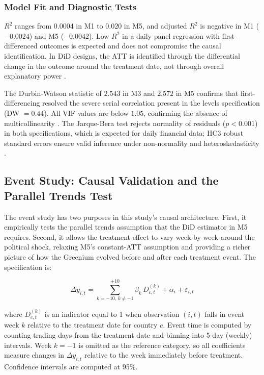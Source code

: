 \documentclass[12pt,a4paper]{article}
\begin{document}
\subsubsection{Model Fit and Diagnostic Tests}

$R^2$ ranges from $0.0004$ in M1 to $0.020$ in M5, and adjusted $R^2$ is negative in M1 ($-0.0024$) and M5 ($-0.0042$). Low $R^2$ in a daily panel regression with first-differenced outcomes is expected and does not compromise the causal identification. In DiD designs, the ATT is identified through the differential change in the outcome around the treatment date, not through overall explanatory power \citep{Callaway2021}.

The Durbin-Watson statistic of $2.543$ in M3 and $2.572$ in M5 confirms that first-differencing resolved the severe serial correlation present in the levels specification (DW $= 0.44$). All VIF values are below $1.05$, confirming the absence of multicollinearity \citep{Chatterjee2012}. The Jarque-Bera test rejects normality of residuals ($p < 0.001$) in both specifications, which is expected for daily financial data; HC3 robust standard errors ensure valid inference under non-normality and heteroskedasticity \citep{MacKinnon1985}.

\subsection{Event Study: Causal Validation and the Parallel Trends Test}

The event study has two purposes in this study's causal architecture. First, it empirically tests the parallel trends assumption that the DiD estimator in M5 requires. Second, it allows the treatment effect to vary week-by-week around the political shock, relaxing M5's constant-ATT assumption and providing a richer picture of how the Greenium evolved before and after each treatment event. The specification is:

\begin{equation}
\Delta y_{i,t} = \sum_{k = -10,\, k \neq -1}^{+10} \beta_k \, D^{(k)}_{c,t} + \alpha_i + \varepsilon_{i,t}
\label{eq:eventstudy}
\end{equation}

\noindent where $D^{(k)}_{c,t}$ is an indicator equal to 1 when observation $(i,t)$ falls in event week $k$ relative to the treatment date for country $c$. Event time is computed by counting trading days from the treatment date and binning into 5-day (weekly) intervals. Week $k = -1$ is omitted as the reference category, so all coefficients measure changes in $\Delta y_{i,t}$ relative to the week immediately before treatment. Confidence intervals are computed at 95\%.
\end{document}
